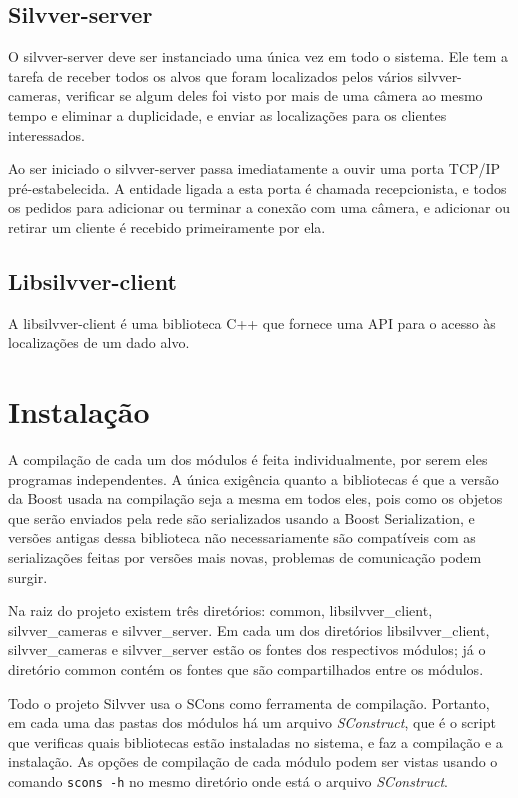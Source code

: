 \documentclass[a4paper,10pt]{article}
\begin{document}
\subsection{Silvver-server}

O silvver-server deve ser instanciado uma única vez em todo o sistema. Ele tem
a tarefa de receber todos os alvos que foram localizados pelos vários
silvver-cameras, verificar se algum deles foi visto por mais de uma câmera ao
mesmo tempo e eliminar a duplicidade, e enviar as localizações para os
clientes interessados.

Ao ser iniciado o silvver-server passa imediatamente a ouvir uma porta TCP/IP
pré-estabelecida. A entidade ligada a esta porta é chamada recepcionista, e
todos os pedidos para adicionar ou terminar a conexão com uma câmera, e
adicionar ou retirar um cliente é recebido primeiramente por ela.


\subsection{Libsilvver-client}

A libsilvver-client é uma biblioteca C++ que fornece uma API para o acesso às
localizações de um dado alvo.

\section{Instalação}

A compilação de cada um dos módulos é feita individualmente, por serem eles
programas independentes. A única exigência quanto a bibliotecas é que a versão
da Boost\cite{boost} usada na compilação seja a mesma em todos eles, pois como
os objetos que serão enviados pela rede são serializados usando a Boost
Serialization, e versões antigas dessa biblioteca não necessariamente são
compatíveis com as serializações feitas por versões mais novas, problemas de
comunicação podem surgir.

Na raiz do projeto existem três diretórios: common, libsilvver\_client,
silvver\_cameras e silvver\_server. Em cada um dos diretórios
libsilvver\_client, silvver\_cameras e silvver\_server estão os fontes dos
respectivos módulos; já o diretório common contém os fontes que são
compartilhados entre os módulos.

Todo o projeto Silvver usa o SCons\cite{scons} como ferramenta de
compilação. Portanto, em cada uma das pastas dos módulos há um arquivo
\emph{SConstruct}, que é o script que verificas quais bibliotecas estão
instaladas no sistema, e faz a compilação e a instalação. As opções de
compilação de cada módulo podem ser vistas usando o comando \texttt{scons -h}
no mesmo diretório onde está o arquivo \emph{SConstruct}.
\end{document}
